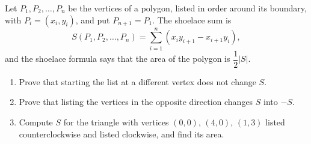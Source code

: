 Let $P_1,P_2,\dots,P_n$ be the vertices of a polygon, listed in order around its boundary, with $P_i=(x_i,y_i)$, and put $P_{n+1}=P_1$. The shoelace sum is
\[
S\left(P_1,P_2,\dots,P_n\right)=\sum_{i=1}^{n}\left(x_iy_{i+1}-x_{i+1}y_i\right),
\]
and the shoelace formula says that the area of the polygon is $\dfrac{1}{2}|S|$.
\begin{enumerate}
\item[(a)] Prove that starting the list at a different vertex does not change $S$.
\item[(b)] Prove that listing the vertices in the opposite direction changes $S$ into $-S$.
\item[(c)] Compute $S$ for the triangle with vertices $(0,0)$, $(4,0)$, $(1,3)$ listed counterclockwise and listed clockwise, and find its area.
\end{enumerate}
